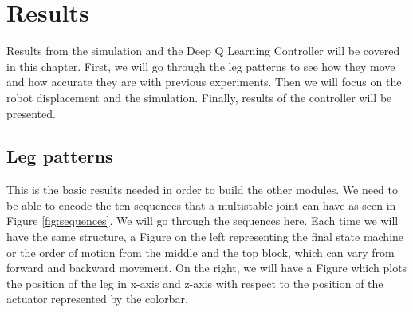\chapter{Results}
    Results from the simulation and the Deep Q Learning Controller will be covered in this chapter. First, we will go through the leg patterns to see how they move and how accurate they are with previous experiments. Then we will focus on the robot displacement and the simulation. Finally, results of the controller will be presented.
    
    \section{Leg patterns}\label{sec:res_legs}
        This is the basic results needed in order to build the other modules. We need to be able to encode the ten sequences that a multistable joint can have as seen in Figure \ref{fig:sequences}. We will go through the sequences here. Each time we will have the same structure, a Figure on the left representing the final state machine or the order of motion from the middle and the top block, which can vary from forward and backward movement. On the right, we will have a Figure which plots the position of the leg in x-axis and z-axis with respect to the position of the actuator represented by the colorbar.
